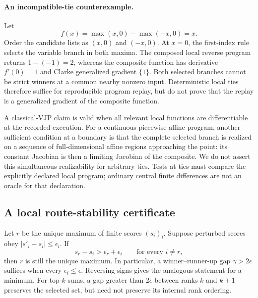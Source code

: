 \paragraph{An incompatible-tie counterexample.}
Let
\begin{equation}
 f(x)=\max(x,0)-\max(-x,0)=x.
\end{equation}
Order the candidate lists as $(x,0)$ and $(-x,0)$. At $x=0$, the first-index
rule selects the variable branch in both maxima. The composed local reverse
program returns $1-(-1)=2$, whereas the composite function has derivative
$f'(0)=1$ and Clarke generalized gradient $\{1\}$. Both selected branches
cannot be strict winners at a common nearby nonzero input. Deterministic
local ties therefore suffice for reproducible program replay, but do not
prove that the replay is a generalized gradient of the composite function.

A classical-VJP claim is valid when all relevant local functions are
differentiable at the recorded execution. For a continuous piecewise-affine
program, another sufficient condition at a boundary is that the complete
selected branch is realized on a sequence of full-dimensional affine regions
approaching the point: its constant Jacobian is then a limiting Jacobian of
the composite. We do not assert this simultaneous realizability for arbitrary
ties. Tests at ties must compare the explicitly declared local program;
ordinary central finite differences are not an oracle for that declaration.

\subsection{A local route-stability certificate}
\label{app:margin}

\begin{proposition}
\label{prop:score-gap}
Let $r$ be the unique maximum of finite scores $(s_i)_i$. Suppose perturbed
scores obey $|s'_i-s_i|\leq\epsilon_i$. If
\begin{equation}
 s_r-s_i>\epsilon_r+\epsilon_i \qquad\text{for every }i\ne r,
\end{equation}
then $r$ is still the unique maximum. In particular, a winner--runner-up gap
$\gamma>2\epsilon$ suffices when every $\epsilon_i\leq\epsilon$. Reversing
signs gives the analogous statement for a minimum. For top-$k$ sums, a gap
greater than $2\epsilon$ between ranks $k$ and $k+1$ preserves the selected
set, but need not preserve its internal rank ordering.
\end{proposition}

